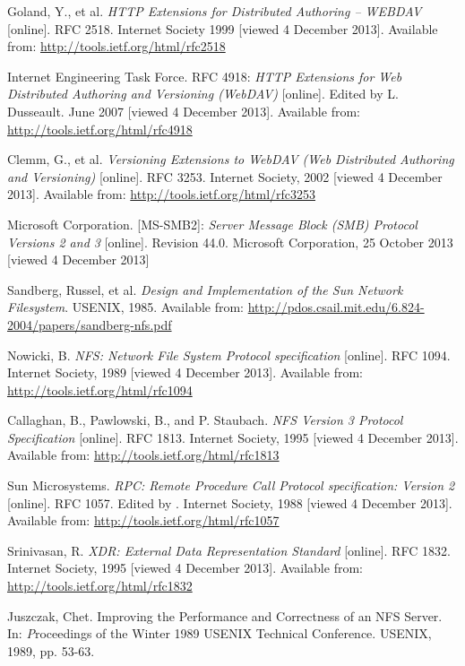 \begin{thebibliography}{99}
	{\sc Goland,} Y., et al.
	\emph{HTTP Extensions for Distributed Authoring -- WEBDAV}
	[online].
	RFC 2518.
	Internet Society 1999 [viewed 4 December 2013].
	Available from: \url{http://tools.ietf.org/html/rfc2518}

	{\sc Internet Engineering Task Force}.
	RFC 4918:
	\emph{HTTP Extensions for Web Distributed Authoring and Versioning (WebDAV)}
	[online].
	Edited by L. Dusseault.
	June 2007 [viewed 4 December 2013].
	Available from: \url{http://tools.ietf.org/html/rfc4918}

	{\sc Clemm,} G., et al.
	\emph{Versioning Extensions to WebDAV (Web Distributed Authoring and Versioning)}
	[online].
	RFC 3253.
	Internet Society, 2002 [viewed 4 December 2013].
	Available from: \url{http://tools.ietf.org/html/rfc3253}

	{\sc Microsoft Corporation}.
	[MS-SMB2]:
	\emph{Server Message Block (SMB) Protocol Versions 2 and 3}
	[online].
	Revision 44.0.
	Microsoft Corporation, 25 October 2013 [viewed 4 December 2013]

	{\sc Sandberg,} Russel, et al.
	\emph {Design and Implementation of the Sun Network Filesystem}.
	USENIX, 1985.
	Available from: \newline \url{http://pdos.csail.mit.edu/6.824-2004/papers/sandberg-nfs.pdf}

	{\sc Nowicki,} B.
	\emph{NFS: Network File System Protocol specification}
	[online].
	RFC 1094.
	Internet Society, 1989 [viewed 4 December 2013].
	Available from: \url{http://tools.ietf.org/html/rfc1094}

	{\sc Callaghan,} B., {\sc Pawlowski,} B., and P. {\sc Staubach}.
	\emph{NFS Version 3 Protocol Specification}
	[online].
	RFC 1813.
	Internet Society, 1995 [viewed 4 December 2013].
	Available from: \url{http://tools.ietf.org/html/rfc1813}

	{\sc Sun Microsystems}.
	\emph{RPC: Remote Procedure Call Protocol specification: Version 2}
	[online].
	RFC 1057.
	Edited by .
	Internet Society, 1988 [viewed 4 December 2013].
	Available from: \url{http://tools.ietf.org/html/rfc1057}

	{\sc Srinivasan,} R.
	\emph{XDR: External Data Representation Standard}
	[online].
	RFC 1832.
	Internet Society, 1995 [viewed 4 December 2013].
	Available from: \url{http://tools.ietf.org/html/rfc1832}

	{\sc Juszczak,} Chet.
	Improving the Performance and Correctness of an NFS Server.
	In: {\emph Proceedings of the Winter 1989 USENIX Technical Conference}.
	USENIX, 1989, pp. 53-63.


\end{thebibliography}
